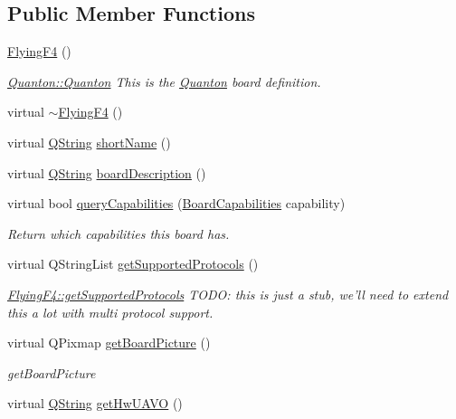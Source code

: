 \subsection*{\-Public \-Member \-Functions}
\begin{DoxyCompactItemize}
\item 
\hyperlink{group___boards___stm_ga520fa9de4d28a0754a9ea798a89e3b56}{\-Flying\-F4} ()
\begin{DoxyCompactList}\small\item\em \hyperlink{group___boards___quantec_ga39ce601b1744d463fc4a56681c46135f}{\-Quanton\-::\-Quanton} \-This is the \hyperlink{class_quanton}{\-Quanton} board definition. \end{DoxyCompactList}\item 
virtual \hyperlink{group___boards___stm_ga901ea50bfeb75a8d451c5fa8f303f8b5}{$\sim$\-Flying\-F4} ()
\item 
virtual \hyperlink{group___u_a_v_objects_plugin_gab9d252f49c333c94a72f97ce3105a32d}{\-Q\-String} \hyperlink{group___boards___stm_ga779f6089f1d7444e4a5aad46aa1eec56}{short\-Name} ()
\item 
virtual \hyperlink{group___u_a_v_objects_plugin_gab9d252f49c333c94a72f97ce3105a32d}{\-Q\-String} \hyperlink{group___boards___stm_gaf26e4b2a68ac23e2d7aaa38e1efedc61}{board\-Description} ()
\item 
virtual bool \hyperlink{group___boards___stm_gae8c3f46dea83e638e7b1e9c00658cae6}{query\-Capabilities} (\hyperlink{group___core_plugin_ga01b09218f2a13aaeee6db007ac6bd967}{\-Board\-Capabilities} capability)
\begin{DoxyCompactList}\small\item\em \-Return which capabilities this board has. \end{DoxyCompactList}\item 
virtual \-Q\-String\-List \hyperlink{group___boards___stm_ga414c6ad3220b62ad6230c97f000bfbac}{get\-Supported\-Protocols} ()
\begin{DoxyCompactList}\small\item\em \hyperlink{group___boards___stm_ga414c6ad3220b62ad6230c97f000bfbac}{\-Flying\-F4\-::get\-Supported\-Protocols} \-T\-O\-D\-O\-: this is just a stub, we'll need to extend this a lot with multi protocol support. \end{DoxyCompactList}\item 
virtual \-Q\-Pixmap \hyperlink{group___boards___stm_ga8d3b2a7f81995719e2f8822e5cb8d97f}{get\-Board\-Picture} ()
\begin{DoxyCompactList}\small\item\em get\-Board\-Picture \end{DoxyCompactList}\item 
virtual \hyperlink{group___u_a_v_objects_plugin_gab9d252f49c333c94a72f97ce3105a32d}{\-Q\-String} \hyperlink{group___boards___stm_ga08faac554f32814ae7d1b13cd06ae759}{get\-Hw\-U\-A\-V\-O} ()
\end{DoxyCompactItemize}


